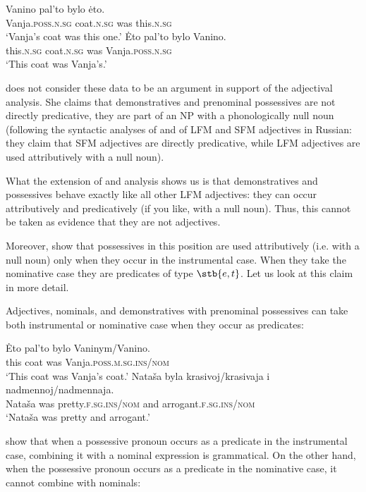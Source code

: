 \documentclass[output=paper]{langscibook}
\begin{document}

\ea
    \ea \gll Vanino pal'to bylo ėto.\\
    Vanja.\textsc{poss.n.sg} coat.\textsc{n.sg} was this.\textsc{n.sg}\\
    \glt `Vanja's coat was this one.'
    \ex \gll Ėto pal'to bylo Vanino.\\
    this.\textsc{n.sg} coat.\textsc{n.sg} was Vanja.\textsc{poss.n.sg}\\
    \glt `This coat was Vanja's.'
\z\z

\noindent \citet{Pereltsvaig2007} does not consider these data to be an argument in support of the adjectival analysis. She claims that demonstratives and prenominal possessives are not directly predicative, they are part of an NP with a phonologically null noun (following the syntactic analyses of \citealt{Babby1975} and \citealt{Bailyn1994} of LFM and SFM adjectives in Russian: they claim that SFM adjectives are directly predicative, while LFM adjectives are used attributively with a null noun).

What the extension of  and  analysis shows us is that demonstratives and possessives behave exactly like all other LFM adjectives: they can occur attributively and predicatively (if you like, with a null noun). Thus, this cannot be taken as evidence that they are not adjectives. 

Moreover, \citet{Partee.Borschev2003} show that possessives in this position are used attributively (i.e. with a null noun) only when they occur in the instrumental case. When they take the nominative case they are predicates of type $\stb{e,t}$. Let us look at this claim in more detail. 

Adjectives, nominals, and demonstratives with prenominal possessives can take both instrumental or nominative case when they occur as predicates:


\ea
    \ea \gll Ėto pal'to bylo Vaninym/Vanino.\\
    this coat was Vanja.\textsc{poss.m.sg.ins/nom}\\
    \glt `This coat was Vanja's coat.'
    \ex \gll Nataša byla krasivoj/krasivaja i nadmennoj/nadmennaja.\\
    Nataša was pretty.\textsc{f.sg.ins/nom} and arrogant.\textsc{f.sg.ins/nom}\\
    \glt `Nataša was pretty and arrogant.'
\z\z

\noindent \citeauthor{Partee.Borschev2003} show that when a possessive pronoun occurs as a predicate in the instrumental case, combining it with a nominal expression is grammatical. On the other hand, when the possessive pronoun occurs as a predicate in the nominative case, it cannot combine with nominals: 
\end{document}
